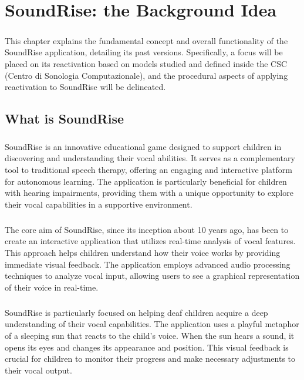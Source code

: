 
\chapter{SoundRise: the Background Idea}
\label{chp:background}

\paragraph{}
This chapter explains the fundamental concept and overall functionality of the SoundRise application, detailing its past versions. Specifically, a focus will be placed on its reactivation based on models studied and defined inside the CSC (Centro di Sonologia Computazionale), and the procedural aspects of applying reactivation to SoundRise will be delineated.

\section{What is SoundRise}
\label{sec:what-is-soundrise}

\paragraph{}
SoundRise is an innovative educational game designed to support children in discovering and understanding their vocal abilities. It serves as a complementary tool to traditional speech therapy, offering an engaging and interactive platform for autonomous learning. The application is particularly beneficial for children with hearing impairments, providing them with a unique opportunity to explore their vocal capabilities in a supportive environment.

\paragraph{}
The core aim of SoundRise, since its inception about 10 years ago, has been to create an interactive application that utilizes real-time analysis of vocal features. This approach helps children understand how their voice works by providing immediate visual feedback. The application employs advanced audio processing techniques to analyze vocal input, allowing users to see a graphical representation of their voice in real-time.

\paragraph{}
SoundRise is particularly focused on helping deaf children acquire a deep understanding of their vocal capabilities. The application uses a playful metaphor of a sleeping sun that reacts to the child's voice. When the sun hears a sound, it opens its eyes and changes its appearance and position. This visual feedback is crucial for children to monitor their progress and make necessary adjustments to their vocal output.

